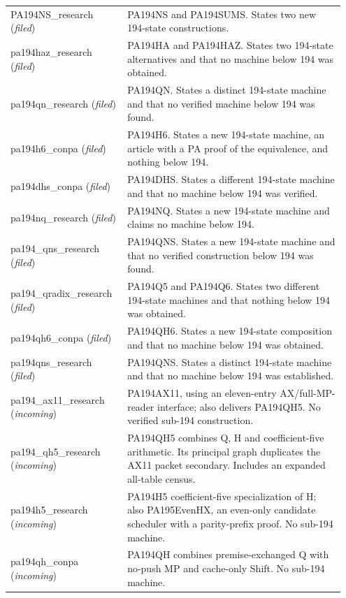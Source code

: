 \begin{longtable}{@{}p{0.33\linewidth}p{0.62\linewidth}@{}}
PA194NS\_\allowbreak{}research (\emph{filed}) & PA194NS and PA194SUMS. States two new 194-state constructions. \\
pa194haz\_\allowbreak{}research (\emph{filed}) & PA194HA and PA194HAZ. States two 194-state alternatives and that no machine below 194 was obtained. \\
pa194qn\_\allowbreak{}research (\emph{filed}) & PA194QN. States a distinct 194-state machine and that no verified machine below 194 was found. \\
pa194h6\_\allowbreak{}conpa (\emph{filed}) & PA194H6. States a new 194-state machine, an article with a PA proof of the equivalence, and nothing below 194. \\
pa194dhs\_\allowbreak{}conpa (\emph{filed}) & PA194DHS. States a different 194-state machine and that no machine below 194 was verified. \\
pa194nq\_\allowbreak{}research (\emph{filed}) & PA194NQ. States a new 194-state machine and claims no machine below 194. \\
pa194\_\allowbreak{}qns\_\allowbreak{}research (\emph{filed}) & PA194QNS. States a new 194-state machine and that no verified construction below 194 was found. \\
pa194\_\allowbreak{}qradix\_\allowbreak{}research (\emph{filed}) & PA194Q5 and PA194Q6. States two different 194-state machines and that nothing below 194 was obtained. \\
pa194qh6\_\allowbreak{}conpa (\emph{filed}) & PA194QH6. States a new 194-state composition and that no machine below 194 was obtained. \\
pa194qns\_\allowbreak{}research (\emph{filed}) & PA194QNS. States a distinct 194-state machine and that no machine below 194 was established. \\
pa194\_\allowbreak{}ax11\_\allowbreak{}research (\emph{incoming}) & PA194AX11, using an eleven-entry AX/full-MP-reader interface; also delivers PA194QH5. No verified sub-194 construction. \\
pa194\_\allowbreak{}qh5\_\allowbreak{}research (\emph{incoming}) & PA194QH5 combines Q, H and coefficient-five arithmetic. Its principal graph duplicates the AX11 packet secondary. Includes an expanded all-table census. \\
pa194h5\_\allowbreak{}research (\emph{incoming}) & PA194H5 coefficient-five specialization of H; also PA195EvenHX, an even-only candidate scheduler with a parity-prefix proof. No sub-194 machine. \\
pa194qh\_\allowbreak{}conpa (\emph{incoming}) & PA194QH combines premise-exchanged Q with no-push MP and cache-only Shift. No sub-194 machine. \\

\end{longtable}
